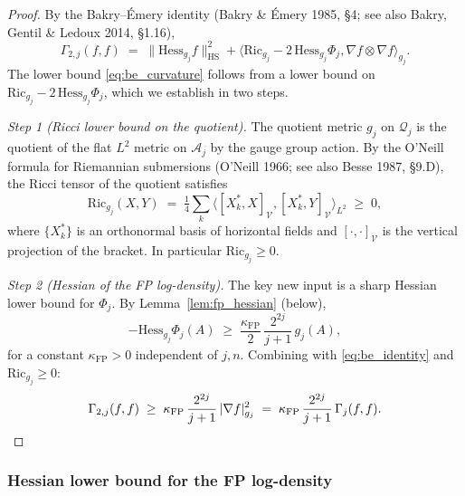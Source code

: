 \begin{proof}
By the Bakry--\'Emery identity (Bakry \& \'Emery 1985, \S 4;
see also Bakry, Gentil \& Ledoux 2014, \S 1.16),
\begin{equation}
\label{eq:be_identity}
  \Gamma_{2,j}(f,f)\;=\;\|\mathrm{Hess}_{g_{j}}f\|_{\mathrm{HS}}^{2}
  +\langle\mathrm{Ric}_{g_{j}}-2\,\mathrm{Hess}_{g_{j}}\Phi_{j},
  \nabla f\otimes\nabla f\rangle_{g_{j}}.
\end{equation}
The lower bound \eqref{eq:be_curvature} follows from a lower
bound on
$\mathrm{Ric}_{g_{j}}-2\,\mathrm{Hess}_{g_{j}}\Phi_{j}$, which we
establish in two steps.

\emph{Step 1 (Ricci lower bound on the quotient).} The quotient
metric $g_{j}$ on $\mathcal{Q}_{j}$ is the quotient of the flat
$L^{2}$ metric on $\mathcal{A}_{j}$ by the gauge group action.
By the O'Neill formula for Riemannian submersions
(O'Neill 1966; see also Besse 1987, \S 9.D), the Ricci tensor of
the quotient satisfies
\begin{equation}
\label{eq:oneill_ricci}
  \mathrm{Ric}_{g_{j}}(X,Y)\;=\;\tfrac{1}{4}\sum_{k}
  \langle[X_{k}^{*},X]_{\mathcal{V}},[X_{k}^{*},Y]_{\mathcal{V}}
  \rangle_{L^{2}}\;\ge\;0,
\end{equation}
where $\{X_{k}^{*}\}$ is an orthonormal basis of horizontal
fields and $[\cdot,\cdot]_{\mathcal{V}}$ is the vertical
projection of the bracket. In particular
$\mathrm{Ric}_{g_{j}}\ge 0$.

\emph{Step 2 (Hessian of the FP log-density).} The key new input
is a sharp Hessian lower bound for $\Phi_{j}$. By
Lemma~\ref{lem:fp_hessian} (below),
\begin{equation}
\label{eq:fp_hessian_lower}
  -\mathrm{Hess}_{g_{j}}\Phi_{j}(A)\;\ge\;
  \frac{\kappa_{\mathrm{FP}}}{2}\,\frac{2^{2j}}{j+1}\,g_{j}(A),
\end{equation}
for a constant $\kappa_{\mathrm{FP}}>0$ independent of $j,n$.
Combining with \eqref{eq:be_identity} and
$\mathrm{Ric}_{g_{j}}\ge 0$:
\begin{equation*}
  \Gamma_{2,j}(f,f)\;\ge\;
  \kappa_{\mathrm{FP}}\,\frac{2^{2j}}{j+1}\,|\nabla f|_{g_{j}}^{2}
  \;=\;\kappa_{\mathrm{FP}}\,\frac{2^{2j}}{j+1}\,
  \Gamma_{j}(f,f).\qedhere
\end{equation*}
\end{proof}

\subsubsection{Hessian lower bound for the FP log-density}


